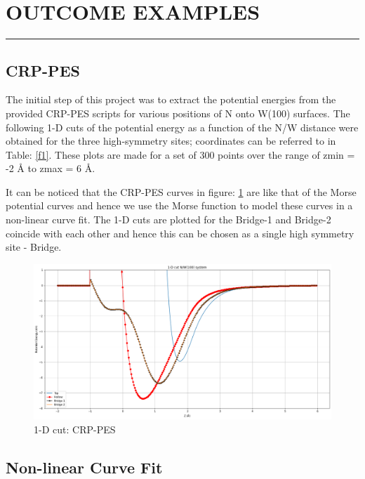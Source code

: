 \documentclass[12pt]{article}
\begin{document}
\section{OUTCOME EXAMPLES}
\par\noindent\rule{\textwidth}{0.4pt}

\subsection{CRP-PES}

The initial step of this project was to extract the potential energies from the provided CRP-PES scripts for various positions of N onto W(100) surfaces. The following 1-D cuts of the potential energy as a function of the N/W distance were obtained for the three high-symmetry sites; coordinates can be referred to in Table: \ref{f1}. These plots are made for a set of 300 points over the range of zmin = -2 \AA \hspace{0.5mm}  to zmax = 6 \AA. 

It can be noticed that the CRP-PES curves in figure: \ref{fig:2}  are like that of the Morse potential curves and hence we use the Morse function to model these curves in a non-linear curve fit. The 1-D cuts are plotted for the Bridge-1 and Bridge-2 coincide with each other and hence this can be chosen as a single high symmetry site - Bridge. 


\begin{figure}[h!]
    \centering
    \includegraphics[scale = 0.35]{1Dcut.png}
    \caption{1-D cut: CRP-PES} 
    
    \label{fig:2}
\end{figure}   

\subsection{Non-linear Curve Fit}
\end{document}
